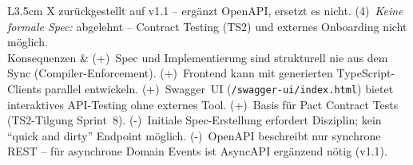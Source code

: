 \begin{tabularx}{\textwidth}{L{3.5cm} X}
  zurückgestellt auf v1.1 -- ergänzt OpenAPI, ersetzt es nicht.
  (4)~\emph{Keine formale Spec:} abgelehnt -- Contract Testing (TS2)
  und externes Onboarding nicht möglich. \\
  Konsequenzen &
  (+)~Spec und Implementierung sind strukturell nie aus dem Sync
  (Compiler-Enforcement). \newline
  (+)~Frontend kann mit generierten TypeScript-Clients parallel
  entwickeln. \newline
  (+)~Swagger~UI (\texttt{/swagger-ui/index.html}) bietet
  interaktives API-Testing ohne externes Tool. \newline
  (+)~Basis für Pact Contract Tests (TS2-Tilgung Sprint~8). \newline
  (-)~Initiale Spec-Erstellung erfordert Disziplin; kein ``quick
  and dirty'' Endpoint möglich. \newline
  (-)~OpenAPI beschreibt nur synchrone REST -- für asynchrone
  Domain Events ist AsyncAPI ergänzend nötig (v1.1). \\
\end{tabularx}

